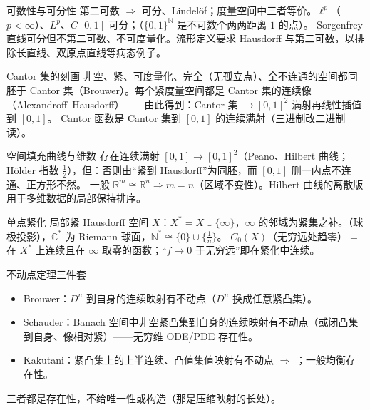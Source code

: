 \begin{结论}{可数性与可分性}
第二可数 $\Rightarrow$ 可分、Lindelöf；度量空间中三者等价。$\ell^p$（$p<\infty$）、$L^p$、$C[0,1]$ 可分；（$\{0,1\}^{\mathbb N}$ 是不可数个两两距离 $1$ 的点）。
Sorgenfrey 直线可分但不第二可数、不可度量化。流形定义要求 Hausdorff 与第二可数，以排除长直线、双原点直线等病态例子。
\end{结论}

\begin{结论}{Cantor 集的刻画}
非空、紧、可度量化、完全（无孤立点）、全不连通的空间都同胚于 Cantor 集（Brouwer）。每个紧度量空间都是 Cantor 集的连续像（Alexandroff--Hausdorff）——由此得到：Cantor 集 $\to[0,1]^2$ 满射再线性插值到 $[0,1]$。
Cantor 函数是 Cantor 集到 $[0,1]$ 的连续满射（三进制改二进制读）。
\end{结论}

\begin{结论}{空间填充曲线与维数}
存在连续满射 $[0,1]\to[0,1]^2$（Peano、Hilbert 曲线；Hölder 指数 $\frac12$），但：否则由“紧到 Hausdorff”为同胚，而 $[0,1]$ 删一内点不连通、正方形不然。
一般 $\mathbb R^m\cong\mathbb R^n\Rightarrow m=n$（区域不变性）。Hilbert 曲线的离散版用于多维数据的局部保持排序。
\end{结论}

\begin{结论}{单点紧化}
局部紧 Hausdorff 空间 $X$：$X^*=X\cup\{\infty\}$，$\infty$ 的邻域为紧集之补。（球极投影），$\mathbb C^*$ 为 Riemann 球面，$\mathbb N^*\cong\{0\}\cup\{\frac1n\}$。
$C_0(X)$（无穷远处趋零）$=$ 在 $X^*$ 上连续且在 $\infty$ 取零的函数；“$f\to0$ 于无穷远”即在紧化中连续。
\end{结论}

\begin{结论}{不动点定理三件套}
\begin{itemize}\setlength{\itemsep}{0pt}
\item Brouwer：$D^n$ 到自身的连续映射有不动点（$D^n$ 换成任意紧凸集）。
\item Schauder：Banach 空间中非空紧凸集到自身的连续映射有不动点（或闭凸集到自身、像相对紧）——无穷维 ODE/PDE 存在性。
\item Kakutani：紧凸集上的上半连续、凸值集值映射有不动点 $\Rightarrow$ ；一般均衡存在性。
\end{itemize}
三者都是存在性，不给唯一性或构造（那是压缩映射的长处）。
\end{结论}

